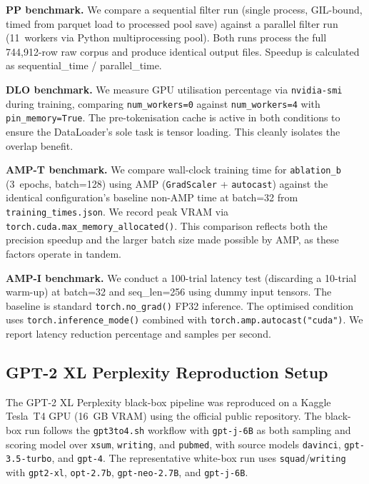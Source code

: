 \documentclass[conference]{IEEEtran}
\begin{document}
\textbf{PP benchmark.} We compare a sequential filter run (single process,
GIL-bound, timed from parquet load to processed pool save) against a parallel
filter run (11~workers via Python multiprocessing pool). Both runs process
the full 744,912-row raw corpus and produce identical output files. Speedup
is calculated as sequential\_time / parallel\_time.

\textbf{DLO benchmark.} We measure GPU utilisation percentage via
\texttt{nvidia-smi} during training, comparing \texttt{num\_workers=0} against
\texttt{num\_workers=4} with \texttt{pin\_memory=True}. The pre-tokenisation
cache is active in both conditions to ensure the DataLoader's sole task is
tensor loading. This cleanly isolates the overlap benefit.

\textbf{AMP-T benchmark.} We compare wall-clock training time for
\texttt{ablation\_b} (3~epochs, batch=128) using AMP (\texttt{GradScaler} +
\texttt{autocast}) against the identical configuration's baseline non-AMP
time at batch=32 from \texttt{training\_times.json}. We record peak VRAM via
\texttt{torch.cuda.max\_memory\_allocated()}. This comparison reflects both
the precision speedup and the larger batch size made possible by AMP, as
these factors operate in tandem.

\textbf{AMP-I benchmark.} We conduct a 100-trial latency test (discarding a
10-trial warm-up) at batch=32 and seq\_len=256 using dummy input tensors.
The baseline is standard \texttt{torch.no\_grad()} FP32 inference. The
optimised condition uses \texttt{torch.inference\_mode()} combined with
\texttt{torch.amp.autocast("cuda")}. We report latency reduction percentage
and samples per second.

\subsection{GPT-2 XL Perplexity Reproduction Setup}
\label{ssec:reprosetup}

The GPT-2 XL Perplexity black-box pipeline was reproduced on a Kaggle
Tesla~T4 GPU (16~GB VRAM) using the official public repository. The black-box
run follows the \texttt{gpt3to4.sh} workflow with \texttt{gpt-j-6B} as both
sampling and scoring model over \texttt{xsum}, \texttt{writing}, and
\texttt{pubmed}, with source models \texttt{davinci},
\texttt{gpt-3.5-turbo}, and \texttt{gpt-4}. The representative white-box run
uses \texttt{squad}/\texttt{writing} with \texttt{gpt2-xl},
\texttt{opt-2.7b}, \texttt{gpt-neo-2.7B}, and \texttt{gpt-j-6B}.
\end{document}
